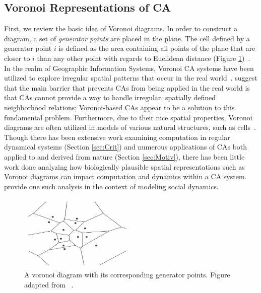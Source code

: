 \documentclass[a4paper,11pt]{report}
\begin{document}

\subsection{Voronoi Representations of CA}
\label{subsec:ModelVoronoiRep}
First, we review the basic idea of Voronoi diagrams. In order to construct a diagram, a set of \textit{generator points} are placed in the plane. The cell defined by a generator point $i$ is defined as the area containing all points of the plane that are closer to $i$ than any other point with regards to Euclidean distance (Figure \ref{fig:voronoi})~\cite{ok09}. In the realm of Geographic Information Systems, Voronoi CA systems have been utilized to explore irregular spatial patterns that occur in the real world~\cite{ca06,sh00}. \citeauthor{sh00} suggest that the main barrier that prevents CAs from being applied in the real world is that CAs cannot provide a way to handle irregular, spatially defined neighborhood relations; Voronoi-based CAs appear to be a solution to this fundamental problem. Furthermore, due to their nice spatial properties, Voronoi diagrams are often utilized in models of various natural structures, such as cells~\cite{ok09}. Though there has been extensive work examining computation in regular dynamical systems (Section \ref{sec:Crit}) and numerous applications of CAs both applied to and derived from nature (Section \ref{sec:Motiv}), there has been little work done analyzing how biologically plausible spatial representations such as Voronoi diagrams can impact computation and dynamics within a CA system. \citeauthor{fl01} provide one such analysis in the context of modeling social dynamics.

\begin{figure}[htp]
\centering
\includegraphics[width=0.5\textwidth]{wh03_fig1_voronoi}
\caption[Voronoi Diagram]{
	A voronoi diagram with its corresponding generator points. Figure adapted from \citeauthor{wh03}~\cite{wh03}.
}
\label{fig:voronoi}
\end{figure}
\end{document}
